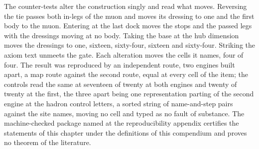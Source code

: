 \begin{chproof}
The counter-tests alter the construction singly and read what moves. Reversing the tie passes both in-legs of the muon and moves its dressing to one and the first body to the muon. Entering at the last dock moves the stops and the passed legs with the dressings moving at no body. Taking the base at the hub dimension moves the dressings to one, sixteen, sixty-four, sixteen and sixty-four. Striking the axiom text unmeets the gate. Each alteration moves the cells it names, four of four. The result was reproduced by an independent route, two engines built apart, a map route against the second route, equal at every cell of the item; the controls read the same at seventeen of twenty at both engines and twenty of twenty at the first, the three apart being one representation parting of the second engine at the hadron control letters, a sorted string of name-and-step pairs against the site names, moving no cell and typed as no fault of substance. The machine-checked package named at the reproducibility appendix certifies the statements of this chapter under the definitions of this compendium and proves no theorem of the literature.
\end{chproof}
